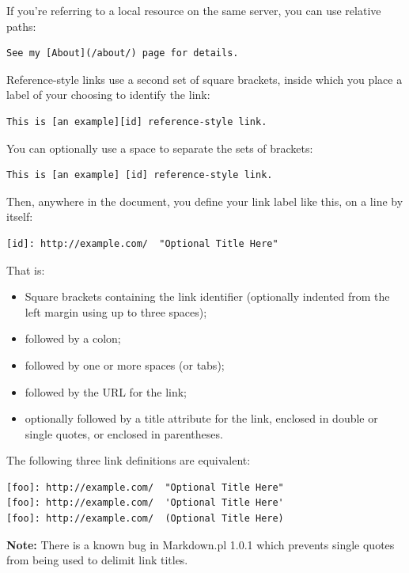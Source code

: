 If you're referring to a local resource on the same server, you can
use relative paths:

\begin{verbatim}
See my [About](/about/) page for details.   
\end{verbatim}

Reference-style links use a second set of square brackets, inside
which you place a label of your choosing to identify the link:

\begin{verbatim}
This is [an example][id] reference-style link.
\end{verbatim}

You can optionally use a space to separate the sets of brackets:

\begin{verbatim}
This is [an example] [id] reference-style link.
\end{verbatim}

Then, anywhere in the document, you define your link label like this,
on a line by itself:

\begin{verbatim}
[id]: http://example.com/  "Optional Title Here"
\end{verbatim}

That is:

\begin{itemize}
\item Square brackets containing the link identifier (optionally
indented from the left margin using up to three spaces);
\item followed by a colon;
\item followed by one or more spaces (or tabs);
\item followed by the URL for the link;
\item optionally followed by a title attribute for the link, enclosed
in double or single quotes, or enclosed in parentheses.
\end{itemize}

The following three link definitions are equivalent:

\begin{verbatim}
[foo]: http://example.com/  "Optional Title Here"
[foo]: http://example.com/  'Optional Title Here'
[foo]: http://example.com/  (Optional Title Here)
\end{verbatim}

\textbf{Note:} There is a known bug in Markdown.pl 1.0.1 which prevents
single quotes from being used to delimit link titles.

